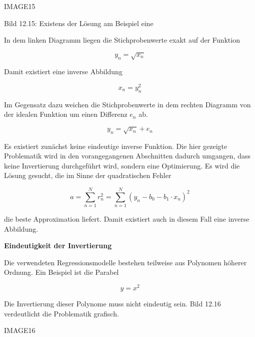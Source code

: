 IMAGE15

\noindent Bild 12.15: Existens der L\"{o}sung am Beispiel eine 

\noindent In dem linken Diagramm liegen die Stichprobenwerte exakt auf der Funktion

\begin{equation}\label{eq:thirteeneightynine}
y_{n} =\sqrt{x_{n}}
\end{equation}

\noindent Damit existiert eine inverse Abbildung

\begin{equation}\label{eq:thirteenninety}
x_{n} =y_{n}^{2}
\end{equation}

\noindent Im Gegensatz dazu weichen die Stichprobenwerte in dem rechten Diagramm von der idealen Funktion um einen Differenz $e_{n}$ ab.

\begin{equation}\label{eq:thirteenninetyone}
y_{n} =\sqrt{x_{n} } +e_{n}
\end{equation}

\noindent Es existiert zun\"{a}chst keine eindeutige inverse Funktion. Die hier gezeigte Problematik wird in den vorangegangenen Abschnitten dadurch umgangen, dass keine Invertierung durchgef\"{u}hrt wird, sondern eine Optimierung. Es wird die L\"{o}sung gesucht, die im Sinne der quadratischen Fehler 

\begin{equation}\label{eq:thirteenninetytwo}
a=\sum _{n=1}^{N}r_{n}^{2}  =\sum _{n=1}^{N}\left(y_{n} -b_{0} -b_{1} \cdot x_{n} \right)^{2}
\end{equation}

\noindent die beste Approximation liefert. Damit existiert auch in diesem Fall eine inverse Abbildung.\bigskip

{\selectfont
\noindent\textbf{Eindeutigkeit der Invertierung}} \smallskip

\noindent Die verwendeten Regressionsmodelle bestehen teilweise aus Polynomen h\"{o}herer Ordnung. Ein Beispiel ist die Parabel

\begin{equation}\label{eq:thirteenninetythree}
y=x^{2}
\end{equation}

\noindent Die Invertierung dieser Polynome muss nicht eindeutig sein. Bild 12.16 verdeutlicht die Problematik grafisch.

IMAGE16

